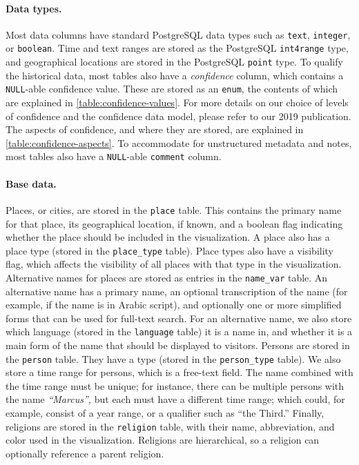 \paragraph{Data types.}
Most data columns have standard PostgreSQL data types such as \verb!text!, \verb!integer!, or \verb!boolean!.
Time and text ranges are stored as the PostgreSQL \verb!int4range! type, and geographical locations are stored in the PostgreSQL \verb!point! type.
To qualify the historical data, most tables also have a \emph{confidence} column, which contains a \verb!NULL!-able confidence value.
These are stored as an \verb!enum!, the contents of which are explained in \cref{table:confidence-values}.
For more details on our choice of levels of confidence and the confidence data model, please refer to our 2019 publication.
The aspects of confidence, and where they are stored, are explained in \cref{table:confidence-aspects}.
To accommodate for unstructured metadata and notes, most tables also have a \verb!NULL!-able \verb!comment! column.


\paragraph{Base data.}
Places, or cities, are stored in the \verb!place! table.
This contains the primary name for that place, its geographical location, if known, and a boolean flag indicating whether the place should be included in the visualization.
A place also has a place type (stored in the \verb!place_type! table).
Place types also have a visibility flag, which affects the visibility of all places with that type in the visualization.
Alternative names for places are stored as entries in the \verb!name_var! table.
An alternative name has a primary name, an optional transcription of the name (for example, if the name is in Arabic script), and optionally one or more simplified forms that can be used for full-text search.
For an alternative name, we also store which language (stored in the \verb!language! table) it is a name in, and whether it is a main form of the name that should be displayed to visitors.
Persons are stored in the \verb!person! table.
They have a type (stored in the \verb!person_type! table).
We also store a time range for persons, which is a free-text field.
The name combined with the time range must be unique;
for instance, there can be multiple persons with the name \emph{\enquote{Marcus},} but each must have a different time range; which could, for example, consist of a year range, or a qualifier such as \enquote{the Third.}
Finally, religions are stored in the \verb!religion! table, with their name, abbreviation, and color used in the visualization.
Religions are hierarchical, so a religion can optionally reference a parent religion.


